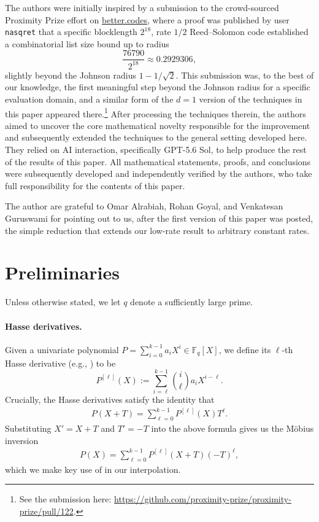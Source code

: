 \documentclass[11pt]{article}
\newcommand{\F}{\mathbb F}
\begin{document}
The authors were initially inspired by a submission to the crowd-sourced
Proximity Prize effort on \url{better.codes}, where a proof was published by user \texttt{nasqret}
that a specific blocklength $2^{18}$, rate $1/2$ Reed--Solomon code established a combinatorial list size bound up to radius
\[
\frac{76790}{2^{18}} \approx 0.2929306,
\]
slightly beyond the Johnson radius $1-1/\sqrt{2}$. This submission was, to the best of our knowledge, the
first meaningful step beyond the Johnson radius for a specific evaluation
domain, and a similar form of the $d=1$ version of the techniques in this
paper appeared there.\footnote{See the submission here: \url{https://github.com/proximity-prize/proximity-prize/pull/122}.} After processing the techniques therein, the authors aimed to uncover the core mathematical novelty responsible for the improvement and 
subsequently extended the techniques to the general setting developed here. They relied on AI interaction, specifically GPT-5.6 Sol, to help produce the rest of the results of this paper. All mathematical statements, proofs, and conclusions were subsequently
developed and independently verified by the authors, who take full responsibility for the contents of this paper.

The author are grateful to Omar Alrabiah, Rohan Goyal, and Venkatesan Guruswami for pointing out to us, after the first version of this paper was posted, the simple reduction that extends our low-rate result to arbitrary constant rates.

\section{Preliminaries}

Unless otherwise stated, we let $q$ denote a sufficiently large prime.

\paragraph{Hasse derivatives.} Given a univariate polynomial $P = \sum_{i=0}^{k-1} a_i X^i \in \F_q[X]$, we define its $\ell$-th Hasse derivative (e.g., \cite{DKSS13}) to be
\[
P^{[\ell]}(X) := \sum_{i=\ell}^{k-1} \binom{i}{\ell} a_i X^{i-\ell}. 
\]
Crucially, the Hasse derivatives satisfy the identity that
\begin{align}
    P(X + T) = \sum_{\ell=0}^{k-1} P^{[\ell]}(X) T^{\ell}.\label{eq:forward}
\end{align}
Substituting $X' = X+T$ and $T' = -T$ into the above formula gives us the M\"obius inversion
\begin{align}
    P(X) = \sum_{\ell=0}^{k-1} P^{[\ell]}(X+T) (-T)^{\ell},\label{eq:backward}
\end{align}
which we make key use of in our interpolation.
\end{document}
